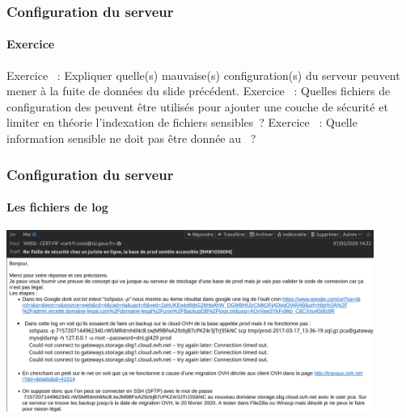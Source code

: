 \documentclass{beamer}
\begin{document}
    \begin{frame}
        \frametitle{Configuration du serveur}
        \framesubtitle{Exercice}
        \transdissolve
        Exercice \execcounterdispinc{}~:
        Expliquer quelle(s) mauvaise(s) configuration(s) du serveur peuvent mener à la fuite de données du slide précédent.
        \bigbreak
        Exercice \execcounterdispinc{}~:
        Quelles fichiers de configuration des  peuvent être utilisés pour ajouter une couche de sécurité et limiter en théorie l'indexation de fichiers sensibles~?
        Exercice \execcounterdispinc{}~:
        Quelle information sensible ne doit pas être donnée au ~?
    \end{frame}

    \begin{frame}
        \frametitle{Configuration du serveur}
        \framesubtitle{Les fichiers de log}
        \transdissolve
        \centering
        \includegraphics[width=12cm]{image/mail-anssi}
    \end{frame}
\end{document}
